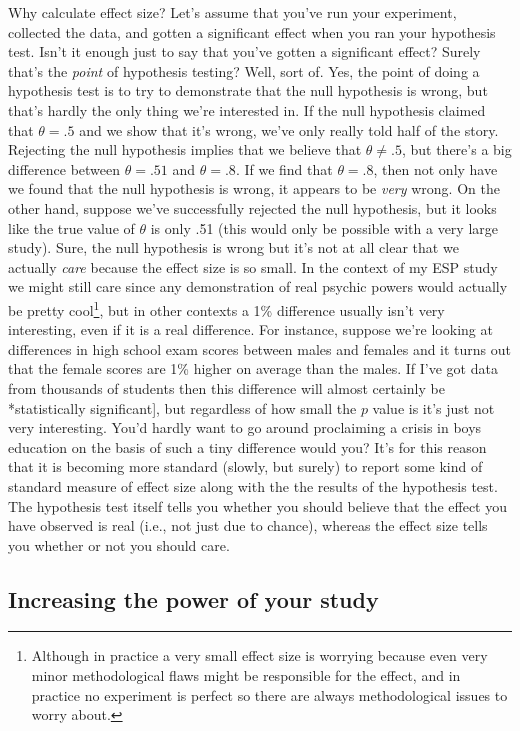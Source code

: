 \documentclass[
]{book}
\begin{document}
Why calculate effect size? Let's assume that you've run your experiment, collected the data, and gotten a significant effect when you ran your hypothesis test. Isn't it enough just to say that you've gotten a significant effect? Surely that's the \emph{point} of hypothesis testing? Well, sort of. Yes, the point of doing a hypothesis test is to try to demonstrate that the null hypothesis is wrong, but that's hardly the only thing we're interested in. If the null hypothesis claimed that \(\theta = .5\) and we show that it's wrong, we've only really told half of the story. Rejecting the null hypothesis implies that we believe that \(\theta \neq .5\), but there's a big difference between \(\theta = .51\) and \(\theta = .8\). If we find that \(\theta = .8\), then not only have we found that the null hypothesis is wrong, it appears to be \emph{very} wrong. On the other hand, suppose we've successfully rejected the null hypothesis, but it looks like the true value of \(\theta\) is only .51 (this would only be possible with a very large study). Sure, the null hypothesis is wrong but it's not at all clear that we actually \emph{care} because the effect size is so small. In the context of my ESP study we might still care since any demonstration of real psychic powers would actually be pretty cool\footnote{Although in practice a very small effect size is worrying because even very minor methodological flaws might be responsible for the effect, and in practice no experiment is perfect so there are always methodological issues to worry about.}, but in other contexts a 1\% difference usually isn't very interesting, even if it is a real difference. For instance, suppose we're looking at differences in high school exam scores between males and females and it turns out that the female scores are 1\% higher on average than the males. If I've got data from thousands of students then this difference will almost certainly be *statistically significant{]}, but regardless of how small the \(p\) value is it's just not very interesting. You'd hardly want to go around proclaiming a crisis in boys education on the basis of such a tiny difference would you? It's for this reason that it is becoming more standard (slowly, but surely) to report some kind of standard measure of effect size along with the the results of the hypothesis test. The hypothesis test itself tells you whether you should believe that the effect you have observed is real (i.e., not just due to chance), whereas the effect size tells you whether or not you should care.

\hypertarget{increasing-the-power-of-your-study}{%
\subsection{Increasing the power of your study}\label{increasing-the-power-of-your-study}}
\end{document}
